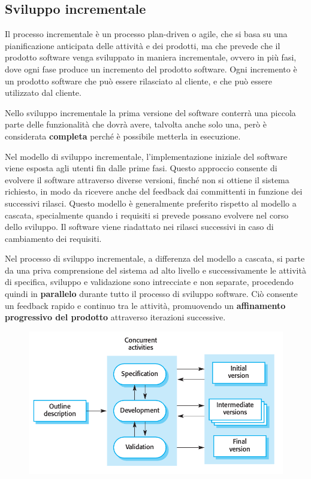 \subsection{Sviluppo incrementale}
Il processo incrementale è un processo plan-driven o agile, che si basa su una pianificazione
anticipata delle attività e dei prodotti, ma che prevede che il prodotto software
venga sviluppato in maniera incrementale, ovvero in più fasi, dove ogni fase
produce un incremento del prodotto software. Ogni incremento è un prodotto software
che può essere rilasciato al cliente, e che può essere utilizzato dal cliente. 

Nello sviluppo incrementale la prima versione del software conterrà una piccola parte 
delle funzionalità che dovrà avere, talvolta anche solo una, però è considerata \textbf{completa} 
perché è possibile metterla in esecuzione.

Nel modello di sviluppo incrementale, l'implementazione iniziale del software viene esposta
agli utenti fin dalle prime fasi. Questo approccio consente di evolvere il software
attraverso diverse versioni, finché non si ottiene il sistema richiesto, in modo 
da ricevere anche del feedback dai committenti in funzione dei successivi rilasci.
Questo modello è generalmente preferito rispetto al modello a cascata,
specialmente quando i requisiti si prevede possano evolvere nel corso dello sviluppo.
Il software viene riadattato nei rilasci successivi in caso di cambiamento dei 
requisiti.

Nel processo di sviluppo incrementale, a differenza del modello a cascata, si parte da una 
priva comprensione del sistema ad alto livello e successivamente le attività di specifica, sviluppo e validazione
sono intrecciate e non separate, procedendo quindi in \textbf{parallelo} durante tutto 
il processo di sviluppo software. Ciò consente un feedback rapido e continuo tra le
attività, promuovendo un \textbf{affinamento progressivo del prodotto} attraverso iterazioni
successive.
\begin{figure}[H]
    \centering
    \includegraphics[scale=0.3]{img/incrementale.png}
\end{figure}
